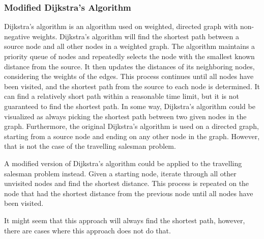 \documentclass{article}
\begin{document}
\subsubsection{Modified Dijkstra's Algorithm}\label{Dijkstras}
Dijkstra's algorithm is an algorithm used on weighted, directed graph with non-negative weights. Dijkstra's algorithm will find the shortest path between a source node and all other nodes in a weighted graph. The algorithm maintains a priority queue of nodes and repeatedly selects the node with the smallest known distance from the source. It then updates the distances of its neighboring nodes, considering the weights of the edges. This process continues until all nodes have been visited, and the shortest path from the source to each node is determined. It can find a relatively short path within a reasonable time limit, but it is not guaranteed to find the shortest path. In some way, Dijkstra's algorithm could be visualized as always picking the shortest path between two given nodes in the graph. Furthermore, the original Dijkstra's algorithm is used on a directed graph, starting from a source node and ending on any other node in the graph. However, that is not the case of the travelling salesman problem.

\noindent
A modified version of Dijkstra's algorithm could be applied to the travelling salesman problem instead. Given a starting node, iterate through all other unvisited nodes and find the shortest distance. This process is repeated on the node that had the shortest distance from the previous node until all nodes have been visited. 

\noindent
It might seem that this approach will always find the shortest path, however, there are cases where this approach does not do that. 
\end{document}
